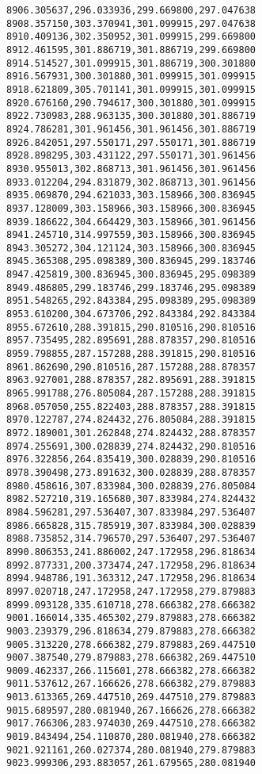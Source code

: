 \documentclass[11pt]{article}
\begin{document}
\begin{Verbatim}[commandchars=\\\{\}]
8906.305637,296.033936,299.669800,297.047638
8908.357150,303.370941,301.099915,297.047638
8910.409136,302.350952,301.099915,299.669800
8912.461595,301.886719,301.886719,299.669800
8914.514527,301.099915,301.886719,300.301880
8916.567931,300.301880,301.099915,301.099915
8918.621809,305.701141,301.099915,301.099915
8920.676160,290.794617,300.301880,301.099915
8922.730983,288.963135,300.301880,301.886719
8924.786281,301.961456,301.961456,301.886719
8926.842051,297.550171,297.550171,301.886719
8928.898295,303.431122,297.550171,301.961456
8930.955013,302.868713,301.961456,301.961456
8933.012204,294.831879,302.868713,301.961456
8935.069870,294.621033,303.158966,300.836945
8937.128009,303.158966,303.158966,300.836945
8939.186622,304.664429,303.158966,301.961456
8941.245710,314.997559,303.158966,300.836945
8943.305272,304.121124,303.158966,300.836945
8945.365308,295.098389,300.836945,299.183746
8947.425819,300.836945,300.836945,295.098389
8949.486805,299.183746,299.183746,295.098389
8951.548265,292.843384,295.098389,295.098389
8953.610200,304.673706,292.843384,292.843384
8955.672610,288.391815,290.810516,290.810516
8957.735495,282.895691,288.878357,290.810516
8959.798855,287.157288,288.391815,290.810516
8961.862690,290.810516,287.157288,288.878357
8963.927001,288.878357,282.895691,288.391815
8965.991788,276.805084,287.157288,288.391815
8968.057050,255.822403,288.878357,288.391815
8970.122787,274.824432,276.805084,288.391815
8972.189001,301.262848,274.824432,288.878357
8974.255691,300.028839,274.824432,290.810516
8976.322856,264.835419,300.028839,290.810516
8978.390498,273.891632,300.028839,288.878357
8980.458616,307.833984,300.028839,276.805084
8982.527210,319.165680,307.833984,274.824432
8984.596281,297.536407,307.833984,297.536407
8986.665828,315.785919,307.833984,300.028839
8988.735852,314.796570,297.536407,297.536407
8990.806353,241.886002,247.172958,296.818634
8992.877331,200.373474,247.172958,296.818634
8994.948786,191.363312,247.172958,296.818634
8997.020718,247.172958,247.172958,279.879883
8999.093128,335.610718,278.666382,278.666382
9001.166014,335.465302,279.879883,278.666382
9003.239379,296.818634,279.879883,278.666382
9005.313220,278.666382,279.879883,269.447510
9007.387540,279.879883,278.666382,269.447510
9009.462337,266.115601,278.666382,278.666382
9011.537612,267.166626,278.666382,279.879883
9013.613365,269.447510,269.447510,279.879883
9015.689597,280.081940,267.166626,278.666382
9017.766306,283.974030,269.447510,278.666382
9019.843494,254.110870,280.081940,278.666382
9021.921161,260.027374,280.081940,279.879883
9023.999306,293.883057,261.679565,280.081940

\end{Verbatim}
\end{document}
